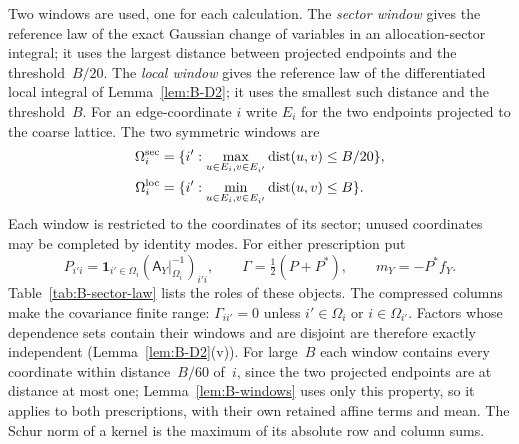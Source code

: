 Two windows are used, one for each calculation. The \emph{sector window} gives the reference law of the exact Gaussian change of variables in an allocation-sector integral; it uses the largest distance between projected endpoints and the threshold~$B/20$. The \emph{local window} gives the reference law of the differentiated local integral of Lemma~\ref{lem:B-D2}; it uses the smallest such distance and the threshold~$B$. For an edge-coordinate $i$ write $E_i$ for the two endpoints projected to the coarse lattice. The two symmetric windows are
\begin{align*}
\Omega_i^{\rm sec}&=\{i':\max_{u\in E_i,v\in E_{i'}}\operatorname{dist}(u,v)\le B/20\},\\
\Omega_i^{\rm loc}&=\{i':\min_{u\in E_i,v\in E_{i'}}\operatorname{dist}(u,v)\le B\}.
\end{align*}
Each window is restricted to the coordinates of its sector; unused coordinates may be completed by identity modes. For either prescription put
\begin{equation}\label{eq:B-window}
P_{i'i}=\mathbf1_{i'\in\Omega_i}(\mathsf A_Y|_{\Omega_i}^{-1})_{i'i},\qquad
\Gamma=\tfrac12(P+P^*),\qquad m_Y=-P^*f_Y.
\end{equation}
Table~\ref{tab:B-sector-law} lists the roles of these objects. The compressed columns make the covariance finite range: $\Gamma_{ii'}=0$ unless $i'\in\Omega_i$ or $i\in\Omega_{i'}$. Factors whose dependence sets contain their windows and are disjoint are therefore exactly independent (Lemma~\ref{lem:B-D2}(v)). For large~$B$ each window contains every coordinate within distance~$B/60$ of~$i$, since the two projected endpoints are at distance at most one; Lemma~\ref{lem:B-windows} uses only this property, so it applies to both prescriptions, with their own retained affine terms and mean. The Schur norm of a kernel is the maximum of its absolute row and column sums.

